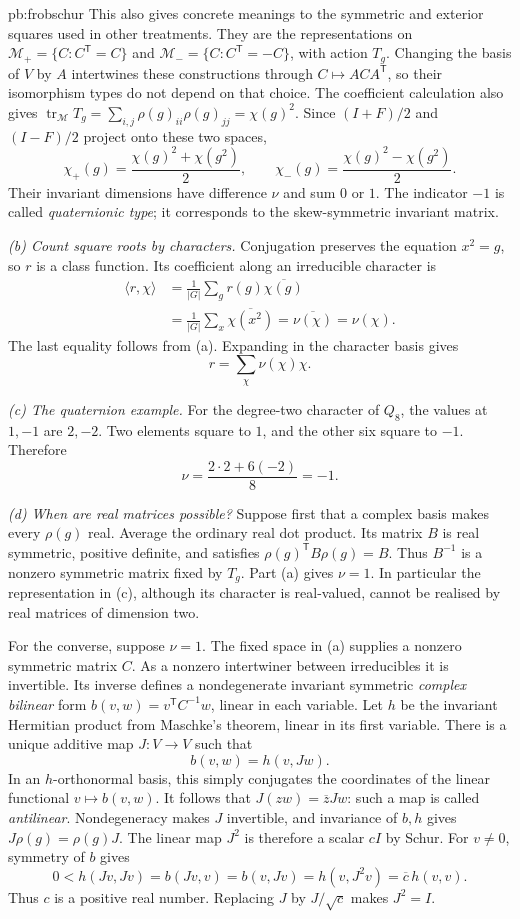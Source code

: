 \begin{solution}{pb:frobschur}
This also gives concrete meanings to the symmetric and exterior squares
used in other treatments. They are the representations on
$\mathcal M_+=\{C:C^{\mathsf T}=C\}$ and
$\mathcal M_-=\{C:C^{\mathsf T}=-C\}$, with action $T_g$.
Changing the basis of $V$ by $A$ intertwines these constructions through
$C\mapsto ACA^{\mathsf T}$, so their isomorphism types do not depend on that choice.
The coefficient calculation also gives $\operatorname{tr}_{\mathcal M}T_g=\sum_{i,j}\rho(g)_{ii}\rho(g)_{jj}=\chi(g)^2$. Since $(I+F)/2$ and $(I-F)/2$ project onto these two spaces,
\[
\chi_+(g)=\frac{\chi(g)^2+\chi(g^2)}2,
\qquad
\chi_-(g)=\frac{\chi(g)^2-\chi(g^2)}2.
\]
Their invariant dimensions have difference $\nu$ and sum $0$ or $1$.
The indicator $-1$ is called \emph{quaternionic type}; it corresponds to
the skew-symmetric invariant matrix.

\emph{(b) Count square roots by characters.}
Conjugation preserves the equation $x^2=g$, so $r$ is a class function.
Its coefficient along an irreducible character is
\[
\begin{aligned}
\langle r,\chi\rangle
&=\frac1{|G|}\sum_g r(g)\overline{\chi(g)}\\
&=\frac1{|G|}\sum_x\overline{\chi(x^2)}
=\overline{\nu(\chi)}=\nu(\chi).
\end{aligned}
\]
The last equality follows from (a). Expanding in the character basis gives
\[
\boxed{r=\sum_\chi\nu(\chi)\chi}.
\]

\emph{(c) The quaternion example.}
For the degree-two character of $Q_8$, the values at $1,-1$ are $2,-2$.
Two elements square to $1$, and the other six square to $-1$.
Therefore
\[
\boxed{\nu=\frac{2\cdot2+6(-2)}8=-1}.
\]

\emph{(d) When are real matrices possible?}
Suppose first that a complex basis makes every $\rho(g)$ real.
Average the ordinary real dot product. Its matrix $B$ is real symmetric,
positive definite, and satisfies $\rho(g)^{\mathsf T}B\rho(g)=B$.
Thus $B^{-1}$ is a nonzero symmetric matrix fixed by $T_g$.
Part (a) gives $\nu=1$.
In particular the representation in (c), although its character is real-valued,
cannot be realised by real matrices of dimension two.

For the converse, suppose $\nu=1$.
The fixed space in (a) supplies a nonzero symmetric matrix $C$.
As a nonzero intertwiner between irreducibles it is invertible.
Its inverse defines a nondegenerate invariant symmetric \emph{complex bilinear}
form $b(v,w)=v^{\mathsf T}C^{-1}w$, linear in each variable.
Let $h$ be the invariant Hermitian product from Maschke's theorem, linear in
its first variable. There is a unique additive map $J:V\to V$ such that
\[
b(v,w)=h(v,Jw).
\]
In an $h$-orthonormal basis, this simply conjugates the coordinates of
the linear functional $v\mapsto b(v,w)$.
It follows that $J(zw)=\overline zJw$: such a map is called \emph{antilinear}.
Nondegeneracy makes $J$ invertible, and invariance of $b,h$ gives
$J\rho(g)=\rho(g)J$.
The linear map $J^2$ is therefore a scalar $cI$ by Schur.
For $v\ne0$, symmetry of $b$ gives
\[
0<h(Jv,Jv)=b(Jv,v)=b(v,Jv)
=h(v,J^2v)=\overline c\,h(v,v).
\]
Thus $c$ is a positive real number.
Replacing $J$ by $J/\sqrt c$ makes $J^2=I$.


\end{solution}
